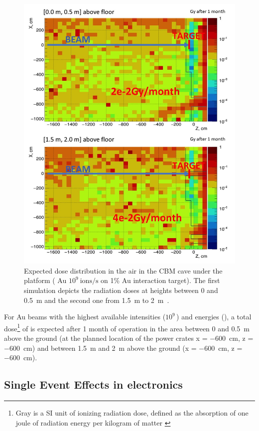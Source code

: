 \begin{figure}[!h]
    \centering
    \includegraphics[width=0.7\columnwidth]{Chapter4/images/Dose00.jpg}
    \caption{Expected dose distribution in the air in the \gls{CBM}
cave under the platform ( Au $10^{9} \mathrm{\ ions/s}$ on 1\% Au
interaction target). The first simulation depicts the radiation doses at heights between 0 and \SI{0.5}{\metre} and the second one from \SI{1.5}{\metre} to \SI{2}{\metre}~\cite{fluka_senger}.} 
    \label{fig:mCBM}
\end{figure}
For Au beams with the highest available intensities 
($10^{9}\,$\ionss) and energies 
(), a total dose\footnote{Gray is a SI unit of ionizing radiation dose, defined as the absorption of one joule of radiation energy per kilogram of matter \cite{gray}} of  is expected after 1 month of operation in the area between 0 and \SI{0.5}{\metre} above the ground (at the planned location of the power crates x = \SI{-600}{\centi\metre}, z = \SI{-600}{\centi\metre}) and  between \SI{1.5}{\metre} and \SI{2}{\metre} above the ground (x = \SI{-600}{\centi\metre}, z = \SI{-600}{\centi\metre}).
 


\subsection{Single Event Effects in electronics}


